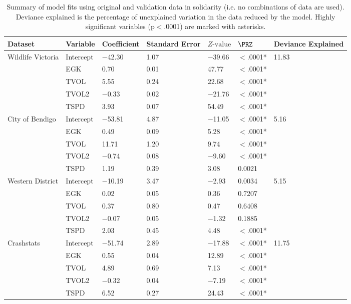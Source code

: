 \begin{table}[!h]
\caption[Summary of model fits using original and validation data]{Summary of model fits using original and validation data in solidarity (i.e. no combinations of data are used). Deviance explained is the percentage of unexplained variation in the data reduced by the model. Highly significant variables (p$<$.0001) are marked with asterisks.}
\centering
\begin{tabularx}{0.9\textwidth}{@{}lllYllY@{}} \toprule
Dataset & Variable & Coefficient & Standard Error & $Z\text{-value}$ & $\PRZ$ & Deviance Explained \\ 
  \midrule
Wildlife Victoria & Intercept & $-$42.30 & 1.07 & $-$39.66 & $<$.0001* & 11.83 \\ 
   & EGK & 0.70 & 0.01 & 47.77 & $<$.0001* &  \\ 
   & TVOL & 5.55 & 0.24 & 22.68 & $<$.0001* &  \\ 
   & TVOL2 & $-$0.33 & 0.02 & $-$21.76 & $<$.0001* &  \\ 
   & TSPD & 3.93 & 0.07 & 54.49 & $<$.0001* &  \\ 
  City of Bendigo & Intercept & $-$53.81 & 4.87 & $-$11.05 & $<$.0001* & 5.16 \\ 
   & EGK & 0.49 & 0.09 & 5.28 & $<$.0001* &  \\ 
   & TVOL & 11.71 & 1.20 & 9.74 & $<$.0001* &  \\ 
   & TVOL2 & $-$0.74 & 0.08 & $-$9.60 & $<$.0001* &  \\ 
   & TSPD & 1.19 & 0.39 & 3.08 & 0.0021 &  \\ 
  Western District & Intercept & $-$10.19 & 3.47 & $-$2.93 & 0.0034 & 5.15 \\ 
   & EGK & 0.02 & 0.05 & 0.36 & 0.7207 &  \\ 
   & TVOL & 0.37 & 0.80 & 0.47 & 0.6408 &  \\ 
   & TVOL2 & $-$0.07 & 0.05 & $-$1.32 & 0.1885 &  \\ 
   & TSPD & 2.03 & 0.45 & 4.48 & $<$.0001* &  \\ 
  Crashstats & Intercept & $-$51.74 & 2.89 & $-$17.88 & $<$.0001* & 11.75 \\ 
   & EGK & 0.55 & 0.04 & 12.89 & $<$.0001* &  \\ 
   & TVOL & 4.89 & 0.69 & 7.13 & $<$.0001* &  \\ 
   & TVOL2 & $-$0.32 & 0.04 & $-$7.19 & $<$.0001* &  \\ 
   & TSPD & 6.52 & 0.27 & 24.43 & $<$.0001* &  \\ 
\bottomrule
\end{tabularx}
\label{val_glm_perf}
\end{table}

